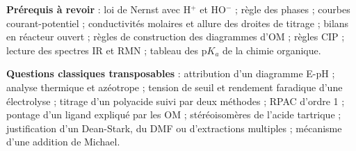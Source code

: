 \documentclass[11pt,a4paper]{article}
\begin{document}
\textbf{Prérequis à revoir} : loi de Nernst avec H\(^+\) et HO\(^-\) ; règle des phases ; courbes courant-potentiel ; conductivités molaires et allure des droites de titrage ; bilans en réacteur ouvert ; règles de construction des diagrammes d'OM ; règles CIP ; lecture des spectres IR et RMN ; tableau des p\(K_a\) de la chimie organique.

\textbf{Questions classiques transposables} : attribution d'un diagramme E-pH ; analyse thermique et azéotrope ; tension de seuil et rendement faradique d'une électrolyse ; titrage d'un polyacide suivi par deux méthodes ; RPAC d'ordre 1 ; pontage d'un ligand expliqué par les OM ; stéréoisomères de l'acide tartrique ; justification d'un Dean-Stark, du DMF ou d'extractions multiples ; mécanisme d'une addition de Michael.
\end{document}
